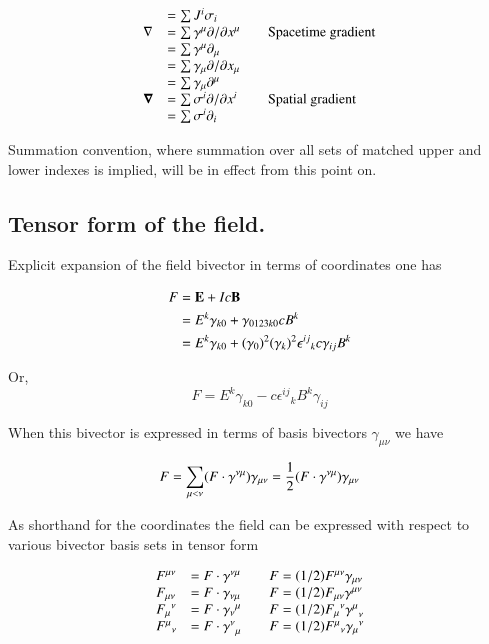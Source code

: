 \documentclass{article}
\newcommand{\grad}[0]{\nabla}
\newcommand{\spacegrad}[0]{\boldsymbol{\nabla}}
\begin{document}
\begin{equation*}
\begin{array}{l l l}
    &= \sum J^i \sigma_i \\
\grad &= \sum \gamma^{\mu} \partial/\partial {x^{\mu}} & \quad \mbox{Spacetime gradient} \\
      &= \sum \gamma^{\mu}\partial_{\mu} \\
      &= \sum \gamma_{\mu} \partial/\partial {x_{\mu}} \\
      &= \sum \gamma_{\mu}\partial^{\mu} \\
\spacegrad &= \sum \sigma^{i} \partial/\partial{x^{i}} & \quad \mbox{Spatial gradient} \\
           &= \sum \sigma^{i}\partial_{i} \\
\end{array}
\end{equation*}

Summation convention, where summation over all sets of matched upper and lower indexes is implied, will be in effect from this point on.

\subsection{ Tensor form of the field. } 

Explicit expansion of the field bivector in terms of coordinates one has

\begin{align*}
F 
&= \mathbf{E} + I c \mathbf{B} \\
&= E^k \gamma_{k0} + \gamma_{0123k0} c B^k \\
&= E^k \gamma_{k0} + {(\gamma_{0})}^2 {(\gamma_{k})}^2 {\epsilon^{ij}}_k c \gamma_{ij} B^k \\
\end{align*}

Or,
\begin{equation}
F = E^k \gamma_{k0} - c {\epsilon^{ij}}_k B^k \gamma_{ij}
\end{equation}

When this bivector is expressed in terms of basis bivectors $\gamma_{\mu\nu}$ we have

\begin{align*}
F 
= \sum_{\mu<\nu} (F \cdot \gamma^{\nu\mu}) \gamma_{\mu\nu}
= \frac{1}{2} (F \cdot \gamma^{\nu\mu}) \gamma_{\mu\nu} 
\end{align*}

As shorthand for the coordinates the field can be expressed with respect to various bivector basis sets in tensor form

\begin{equation*}
\begin{array}{l l l}
F^{\mu\nu} &= F \cdot \gamma^{\nu\mu} & \quad F = (1/2) F^{\mu\nu} \gamma_{\mu\nu} \\
F_{\mu\nu} &= F \cdot \gamma_{\nu\mu} & \quad F = (1/2) F_{\mu\nu} \gamma^{\mu\nu} \\
{F_{\mu}}^\nu &= F \cdot {\gamma_{\nu}}^{\mu} & \quad F = (1/2) {F_{\mu}}^{\nu} {\gamma^{\mu}}_{\nu} \\
{F^{\mu}}_\nu &= F \cdot {\gamma^{\nu}}_{\mu} & \quad F = (1/2) {F^{\mu}}_{\nu} {\gamma_{\mu}}^{\nu}
\end{array}
\end{equation*}
\end{document}
